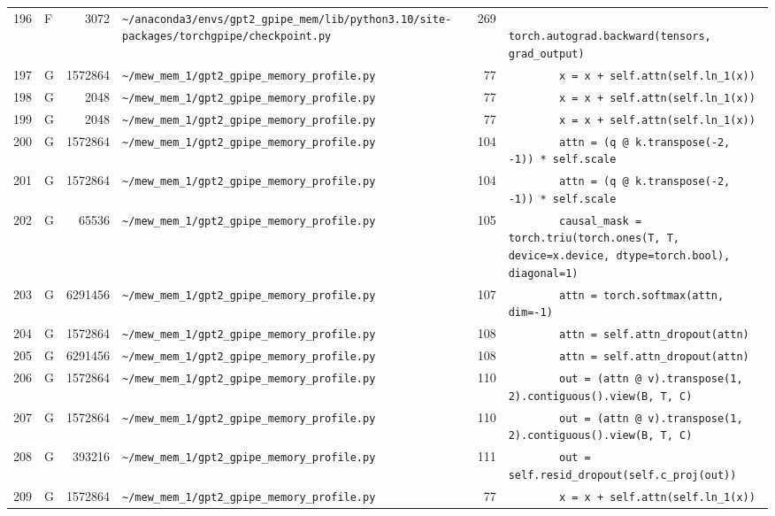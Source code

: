\documentclass{article}
\begin{document}
\begin{longtable}{r l r p{6.5cm} r p{7.0cm}}
196 & F & 3072 & \lstinline|~/anaconda3/envs/gpt2_gpipe_mem/lib/python3.10/site-packages/torchgpipe/checkpoint.py| & 269 & \lstinline|            torch.autograd.backward(tensors, grad_output)| \\
197 & G & 1572864 & \lstinline|~/mew_mem_1/gpt2_gpipe_memory_profile.py| & 77 & \lstinline|        x = x + self.attn(self.ln_1(x))| \\
198 & G & 2048 & \lstinline|~/mew_mem_1/gpt2_gpipe_memory_profile.py| & 77 & \lstinline|        x = x + self.attn(self.ln_1(x))| \\
199 & G & 2048 & \lstinline|~/mew_mem_1/gpt2_gpipe_memory_profile.py| & 77 & \lstinline|        x = x + self.attn(self.ln_1(x))| \\
200 & G & 1572864 & \lstinline|~/mew_mem_1/gpt2_gpipe_memory_profile.py| & 104 & \lstinline|        attn = (q @ k.transpose(-2, -1)) * self.scale| \\
201 & G & 1572864 & \lstinline|~/mew_mem_1/gpt2_gpipe_memory_profile.py| & 104 & \lstinline|        attn = (q @ k.transpose(-2, -1)) * self.scale| \\
202 & G & 65536 & \lstinline|~/mew_mem_1/gpt2_gpipe_memory_profile.py| & 105 & \lstinline|        causal_mask = torch.triu(torch.ones(T, T, device=x.device, dtype=torch.bool), diagonal=1)| \\
203 & G & 6291456 & \lstinline|~/mew_mem_1/gpt2_gpipe_memory_profile.py| & 107 & \lstinline|        attn = torch.softmax(attn, dim=-1)| \\
204 & G & 1572864 & \lstinline|~/mew_mem_1/gpt2_gpipe_memory_profile.py| & 108 & \lstinline|        attn = self.attn_dropout(attn)| \\
205 & G & 6291456 & \lstinline|~/mew_mem_1/gpt2_gpipe_memory_profile.py| & 108 & \lstinline|        attn = self.attn_dropout(attn)| \\
206 & G & 1572864 & \lstinline|~/mew_mem_1/gpt2_gpipe_memory_profile.py| & 110 & \lstinline|        out = (attn @ v).transpose(1, 2).contiguous().view(B, T, C)| \\
207 & G & 1572864 & \lstinline|~/mew_mem_1/gpt2_gpipe_memory_profile.py| & 110 & \lstinline|        out = (attn @ v).transpose(1, 2).contiguous().view(B, T, C)| \\
208 & G & 393216 & \lstinline|~/mew_mem_1/gpt2_gpipe_memory_profile.py| & 111 & \lstinline|        out = self.resid_dropout(self.c_proj(out))| \\
209 & G & 1572864 & \lstinline|~/mew_mem_1/gpt2_gpipe_memory_profile.py| & 77 & \lstinline|        x = x + self.attn(self.ln_1(x))| \\

\end{longtable}
\end{document}
